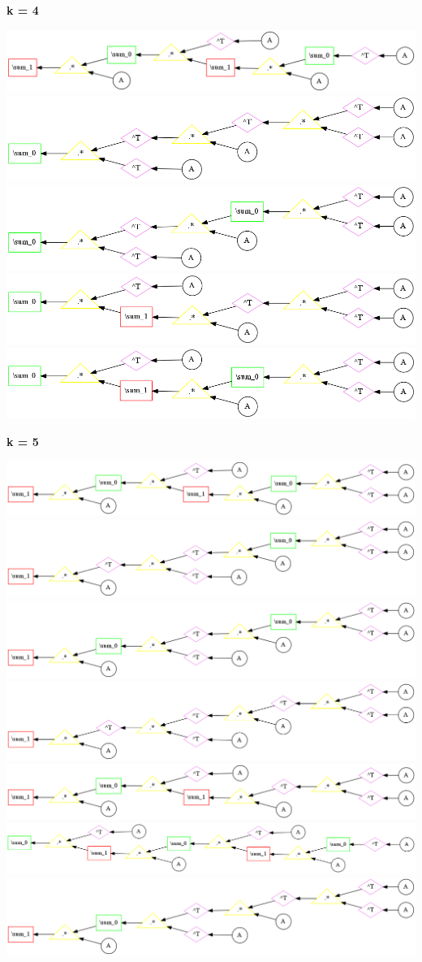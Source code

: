 {\bf k = 4}


\begin{center}
\includegraphics[width=0.45\linewidth]{trees/Sym_4_horizontal_0.png}
\includegraphics[width=0.45\linewidth]{trees/Sym_4_horizontal_1.png}
\includegraphics[width=0.45\linewidth]{trees/Sym_4_horizontal_2.png}
\includegraphics[width=0.45\linewidth]{trees/Sym_4_horizontal_3.png}
\includegraphics[width=0.45\linewidth]{trees/Sym_4_horizontal_4.png}
\end{center}


{\bf k = 5}


\begin{center}
\includegraphics[width=0.45\linewidth]{trees/Sym_5_horizontal_0.png}
\includegraphics[width=0.45\linewidth]{trees/Sym_5_horizontal_1.png}
\includegraphics[width=0.45\linewidth]{trees/Sym_5_horizontal_2.png}
\includegraphics[width=0.45\linewidth]{trees/Sym_5_horizontal_3.png}
\includegraphics[width=0.45\linewidth]{trees/Sym_5_horizontal_4.png}
\includegraphics[width=0.45\linewidth]{trees/Sym_5_horizontal_5.png}
\includegraphics[width=0.45\linewidth]{trees/Sym_5_horizontal_6.png}
\end{center}


